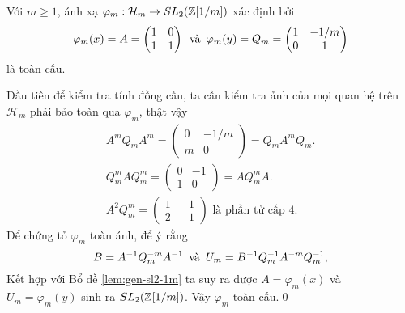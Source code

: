 \begin{lemma}\label{lem:surject-phi-m}
    Với $m \geq 1$, ánh xạ $\varphi_m: \mathcal{H}_m \rightarrow SL_2(\mathbb Z[1/m])$ xác định bởi
    $$
        \varphi_m(x) = A = \begin{pmatrix}
            1 & 0 \\
            1 & 1
        \end{pmatrix} \enskip\text{và}\enskip
        \varphi_m(y) = Q_m = \begin{pmatrix}
            1 & -1/m \\
            0 & 1
        \end{pmatrix}
    $$
    là toàn cấu.
\end{lemma}
\startproof Đầu tiên để kiểm tra tính đồng cấu, ta cần kiểm tra ảnh của mọi quan hệ trên $\mathcal{H}_m$ phải bảo toàn qua $\varphi_m$, thật vậy
\begin{align*}
    A^m Q_m A^m = \begin{pmatrix}
                      0 & -1/m \\
                      m & 0
                  \end{pmatrix} = Q_m A^m Q_m. \\
    Q_m^m A Q_m^m = \begin{pmatrix}
                        0 & -1 \\
                        1 & 0
                    \end{pmatrix} = A Q_m^m A. \\
    A^2Q_m^m = \begin{pmatrix}
                   1 & -1 \\
                   2 & -1
               \end{pmatrix}\text{ là phần tử cấp 4}.
\end{align*}
Để chứng tỏ $\varphi_m$ toàn ánh, để ý rằng
$$
    B = A^{-1}Q_m^{-m}A^{-1}\enskip\text{và}\enskip U_m = B^{-1}Q_m^{-1}A^{-m}Q_m^{-1},
$$
Kết hợp với Bổ đề \ref{lem:gen-sl2-1m} ta suy ra được $A = \varphi_m(x)$ và $U_m = \varphi_m(y)$ sinh ra $SL_2(\mathbb Z[1/m])$. Vậy $\varphi_m$ toàn cấu.\qed

